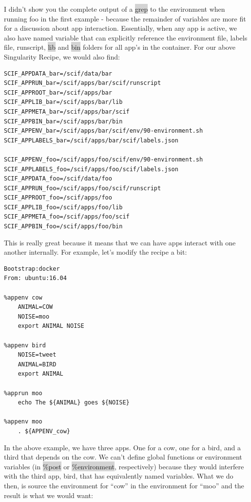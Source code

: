 \documentclass[a4paper]{article}
\newcounter{subsubsubsection}[subsubsection]
\begin{document}
	I didn’t show you the complete output of a \colorbox{lightgray}{grep} to the environment when running foo in the first example - because the remainder of variables are more fit for a discussion about app interaction. Essentially, when any app is active, we also have named variable that can explicitly reference the environment file, labels file, runscript, \colorbox{lightgray}{lib} and \colorbox{lightgray}{bin} folders for all app’s in the container. For our above Singularity Recipe, we would also find:
	
\begin{lstlisting}[frame=single]
SCIF_APPDATA_bar=/scif/data/bar
SCIF_APPRUN_bar=/scif/apps/bar/scif/runscript
SCIF_APPROOT_bar=/scif/apps/bar
SCIF_APPLIB_bar=/scif/apps/bar/lib
SCIF_APPMETA_bar=/scif/apps/bar/scif
SCIF_APPBIN_bar=/scif/apps/bar/bin
SCIF_APPENV_bar=/scif/apps/bar/scif/env/90-environment.sh
SCIF_APPLABELS_bar=/scif/apps/bar/scif/labels.json

SCIF_APPENV_foo=/scif/apps/foo/scif/env/90-environment.sh
SCIF_APPLABELS_foo=/scif/apps/foo/scif/labels.json
SCIF_APPDATA_foo=/scif/data/foo
SCIF_APPRUN_foo=/scif/apps/foo/scif/runscript
SCIF_APPROOT_foo=/scif/apps/foo
SCIF_APPLIB_foo=/scif/apps/foo/lib
SCIF_APPMETA_foo=/scif/apps/foo/scif
SCIF_APPBIN_foo=/scif/apps/foo/bin  
\end{lstlisting}	
	
	
This is really great because it means that we can have apps interact with one another internally. For example, let’s modify the recipe a bit:

\begin{lstlisting}[frame=single] 
Bootstrap:docker
From: ubuntu:16.04

%appenv cow
    ANIMAL=COW
    NOISE=moo
    export ANIMAL NOISE

%appenv bird
    NOISE=tweet
    ANIMAL=BIRD
    export ANIMAL

%apprun moo
    echo The ${ANIMAL} goes ${NOISE}

%appenv moo
    . ${APPENV_cow} 
\end{lstlisting}

In the above example, we have three apps. One for a cow, one for a bird, and a third that depends on the cow. We can’t define global functions or environment variables (in \colorbox{lightgray}{\%post} or \colorbox{lightgray}{\%environment}, respectively) because they would interfere with the third app, bird, that has equivalently named variables. What we do then, is source the environment for “cow” in the environment for “moo” and the result is what we would want:
\end{document}
